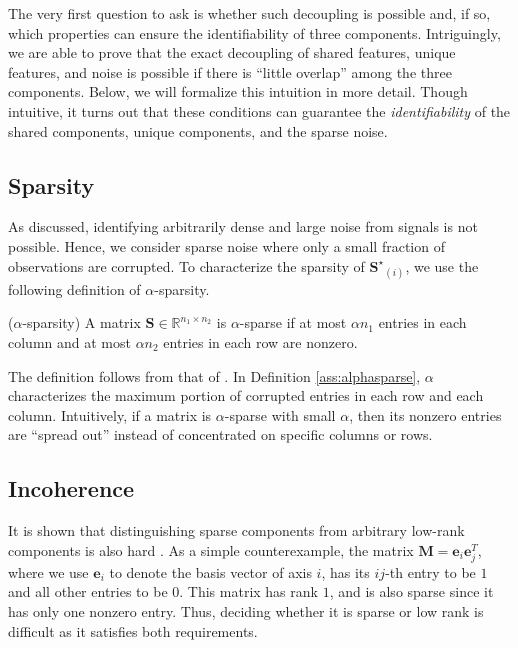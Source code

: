 \documentclass[twoside,11pt]{article}
\newcommand{\matM}{\mathbf{M}}
\newcommand{\matS}{\mathbf{S}}
\newcommand{\matSst}{{\mathbf{S}^\star}}
\newcommand{\vece}{\mathbf{e}}
\begin{document}
The very first question to ask is whether such decoupling is possible and, if so, which properties can ensure the identifiability of three components. Intriguingly, we are able to prove that the exact decoupling of shared features, unique features, and noise is possible if there is ``little overlap'' among the three components. Below, we will formalize this intuition in more detail. Though intuitive, it turns out that these conditions can guarantee the \textit{identifiability} of the shared components, unique components, and the sparse noise. 

\subsection{Sparsity}

As discussed, identifying arbitrarily dense and large noise from signals is not possible. Hence, we consider sparse noise where only a small fraction of observations are corrupted. To characterize the sparsity of $\matSst_{(i)}$, we use the following definition of $\alpha$-sparsity.
\begin{definition}
\label{ass:alphasparse}
($\alpha$-sparsity) A matrix $\matS\in \mathbb{R}^{n_1\times n_2}$ is $\alpha$-sparse if at most $\alpha n_1$ entries in each column and at most $\alpha n_2$ entries in each row are nonzero.
\end{definition}
The definition follows from that of \cite{nonconvexrobustpca}. In Definition \ref{ass:alphasparse}, $\alpha$ characterizes the maximum portion of corrupted entries in each row and each column. Intuitively, if a matrix is $\alpha$-sparse with small $\alpha$, then its nonzero entries are ``spread out'' instead of concentrated on specific columns or rows. %

\subsection{Incoherence}
It is shown that distinguishing sparse components from arbitrary low-rank components is also hard \citep{robustpca,nonconvexrobustpca}. As a simple counterexample, the matrix $\matM=\vece_i\vece_j^T$, where we use $\vece_i$ to denote the basis vector of axis $i$, has its $ij$-th entry to be $1$ and all other entries to be $0$. This matrix has rank $1$, and is also sparse since it has only one nonzero entry. Thus, deciding whether it is sparse or low rank is difficult as it satisfies both requirements. 
\end{document}
